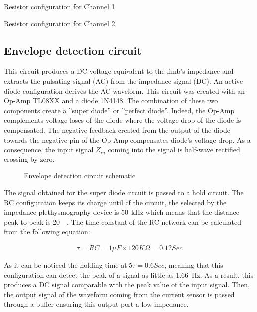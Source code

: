 \begin{table}
    \label{tbl:rch1}
    \caption{Resistor configuration for Channel 1}
\end{table} 

\begin{table}
    \label{tbl:rch2}
    \caption{Resistor configuration for Channel 2}
\end{table} 


\subsection{Envelope detection circuit}
This circuit produces a DC voltage equivalent to the limb's impedance and extracts the pulsating signal (AC) from the impedance signal (DC). An active diode configuration derives the AC waveform. This circuit was created with an Op-Amp TL08XX\cite{ti:TL08xx} and a diode 1N4148. The combination of these two components create a ''super diode'' or ''perfect diode''. Indeed, the Op-Amp complements voltage loses of the diode where the voltage drop of the diode is compensated. The negative feedback created from the output of the diode towards the negative pin of the Op-Amp compensates diode's voltage drop. As a consequence, the input signal $Z_{in}$ coming into the signal is half-wave rectified crossing by zero. 

\begin{figure}
    \label{fig:envelope}
    \caption{Envelope detection circuit schematic}
\end{figure}

The signal obtained for the super diode circuit is passed to a hold circuit. The RC configuration keeps its charge until of the circuit, the selected by the impedance plethysmography device is \SI{50}{\kHz} which means that the distance peak to peak is \SI{20}{\micro\sec}. The time constant of the RC network can be calculated from the following equation:

\begin{align}
\tau = RC = 1 \mu F \times 120K\Omega = 0.12 Sec
\end{align}

As it can be noticed the holding time at $5\tau = 0.6 Sec$, meaning that this configuration can detect the peak of a signal as little as \SI{1.66}{\hertz}. As a result, this produces a DC signal comparable with the peak value of the input signal. Then, the output signal of the waveform coming from the current sensor is passed through a buffer ensuring this output port a low impedance. 

